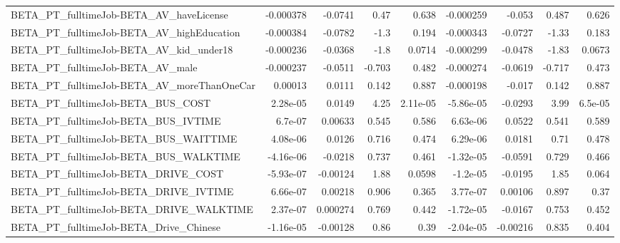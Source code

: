 \begin{tabular}{lrrrrrrrr}
BETA\_PT\_fulltimeJob-BETA\_AV\_haveLicense            &   -0.000378 &      -0.0741 &     0.47 &    0.638 &  -0.000259 &      -0.053 &        0.487 &         0.626 \\
BETA\_PT\_fulltimeJob-BETA\_AV\_highEducation          &   -0.000384 &      -0.0782 &     -1.3 &    0.194 &  -0.000343 &     -0.0727 &        -1.33 &         0.183 \\
BETA\_PT\_fulltimeJob-BETA\_AV\_kid\_under18            &   -0.000236 &      -0.0368 &     -1.8 &   0.0714 &  -0.000299 &     -0.0478 &        -1.83 &        0.0673 \\
BETA\_PT\_fulltimeJob-BETA\_AV\_male                   &   -0.000237 &      -0.0511 &   -0.703 &    0.482 &  -0.000274 &     -0.0619 &       -0.717 &         0.473 \\
BETA\_PT\_fulltimeJob-BETA\_AV\_moreThanOneCar         &     0.00013 &       0.0111 &    0.142 &    0.887 &  -0.000198 &      -0.017 &        0.142 &         0.887 \\
BETA\_PT\_fulltimeJob-BETA\_BUS\_COST                  &    2.28e-05 &       0.0149 &     4.25 & 2.11e-05 &  -5.86e-05 &     -0.0293 &         3.99 &       6.5e-05 \\
BETA\_PT\_fulltimeJob-BETA\_BUS\_IVTIME                &     6.7e-07 &      0.00633 &    0.545 &    0.586 &   6.63e-06 &      0.0522 &        0.541 &         0.589 \\
BETA\_PT\_fulltimeJob-BETA\_BUS\_WAITTIME              &    4.08e-06 &       0.0126 &    0.716 &    0.474 &   6.29e-06 &      0.0181 &         0.71 &         0.478 \\
BETA\_PT\_fulltimeJob-BETA\_BUS\_WALKTIME              &   -4.16e-06 &      -0.0218 &    0.737 &    0.461 &  -1.32e-05 &     -0.0591 &        0.729 &         0.466 \\
BETA\_PT\_fulltimeJob-BETA\_DRIVE\_COST                &   -5.93e-07 &     -0.00124 &     1.88 &   0.0598 &   -1.2e-05 &     -0.0195 &         1.85 &         0.064 \\
BETA\_PT\_fulltimeJob-BETA\_DRIVE\_IVTIME              &    6.66e-07 &      0.00218 &    0.906 &    0.365 &   3.77e-07 &     0.00106 &        0.897 &          0.37 \\
BETA\_PT\_fulltimeJob-BETA\_DRIVE\_WALKTIME            &    2.37e-07 &     0.000274 &    0.769 &    0.442 &  -1.72e-05 &     -0.0167 &        0.753 &         0.452 \\
BETA\_PT\_fulltimeJob-BETA\_Drive\_Chinese             &   -1.16e-05 &     -0.00128 &     0.86 &     0.39 &  -2.04e-05 &    -0.00216 &        0.835 &         0.404 \\

\end{tabular}
